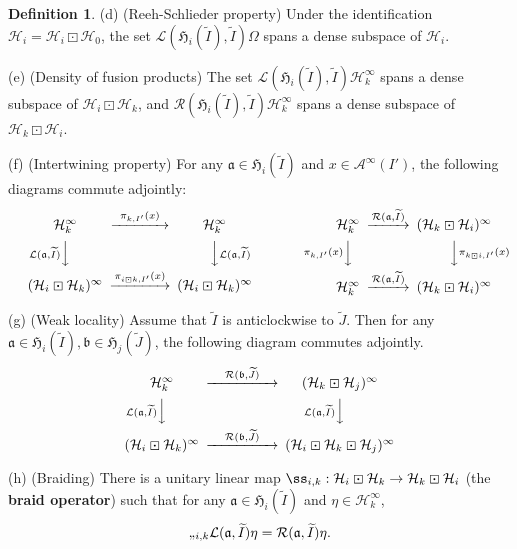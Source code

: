 \documentclass[11pt,b5paper,notitlepage]{article}
\theoremstyle{definition}
\newtheorem{df}{Definition}[subsection]
\theoremstyle{plain}
\newcommand{\fk}{\mathfrak}
\newcommand{\mc}{\mathcal}
\newcommand{\wtd}{\widetilde}
\numberwithin{equation}{subsection}
\begin{document}
\begin{df}
	(d) (Reeh-Schlieder property) Under the identification $\mc H_i=\mc H_i\boxdot\mc H_0$, the set $\mc L(\fk H_i(\wtd I),\wtd I)\Omega$ spans a dense subspace of $\mc H_i$.
	
	(e) (Density of fusion products) The set $\mc L(\fk H_i(\wtd I),\wtd I)\mc H_k^\infty$ spans a dense subspace of $\mc H_i\boxdot\mc H_k$, and $\mc R(\fk H_i(\wtd I),\wtd I)\mc H_k^\infty$ spans a dense subspace of $\mc H_k\boxdot\mc H_i$.
	
(f) (Intertwining property) 	For any $\fk a\in\fk H_i(\wtd I)$ and $x\in\mc A^\infty(I')$, the following diagrams commute adjointly:
\begin{gather}
\begin{CD}
\mc H_k^\infty @>~\pi_{k,I'}(x)~>> \mc H_k^\infty\\
@V \mc L(\fk a,\wtd I)  VV @VV \mc L(\fk a,\wtd I) V\\
(\mc H_i\boxdot\mc H_k)^\infty @> \pi_{i\boxdot k,I'}(x)>> (\mc H_i\boxdot\mc H_k)^\infty
\end{CD}\qquad\qquad\qquad
\begin{CD}
\mc H_k^\infty @> \mc R(\fk a,\wtd I)  >> (\mc H_k\boxdot\mc H_i)^\infty\\
@V \pi_{k,I'}(x) VV @VV \pi_{k\boxdot i,I'}(x) V\\
\mc H_k^\infty @>\mc R(\fk a,\wtd I) >> (\mc H_k\boxdot\mc H_i)^\infty
\end{CD}
\end{gather}
	
	

	(g) (Weak locality) Assume that $\wtd I$ is anticlockwise to $\wtd J$. Then for  any $\fk a\in\fk H_i(\wtd I),\fk b\in\fk H_j(\wtd J)$, the following diagram   commutes adjointly.
	\begin{align}
	\begin{CD}
	\mc H_k^\infty @> \quad \mc R(\fk b,\wtd J)\quad   >> (\mc H_k\boxdot\mc H_j)^\infty\\
	@V \mc L(\fk a,\wtd I)   V  V @V \mc L(\fk a,\wtd I) VV\\
	(\mc H_i\boxdot\mc H_k)^\infty @> \quad \mc R(\fk b,\wtd J) \quad  >> (\mc H_i\boxdot\mc H_k\boxdot\mc H_j)^\infty
	\end{CD}
	\end{align}
	
	(h) (Braiding) There is a unitary linear map $\ss_{i,k}:\mc H_i\boxdot\mc H_k\rightarrow\mc H_k\boxdot \mc H_i$ (the \textbf{braid operator}) such that for any  $\fk a\in\fk H_i(\wtd I)$ and $\eta\in\mc H_k^\infty$,
	\begin{align}
	\ss_{i,k} \mc L(\fk a,\wtd I)\eta=\mc R(\fk a,\wtd I)\eta.
	\end{align}
	

\end{df}
\end{document}
